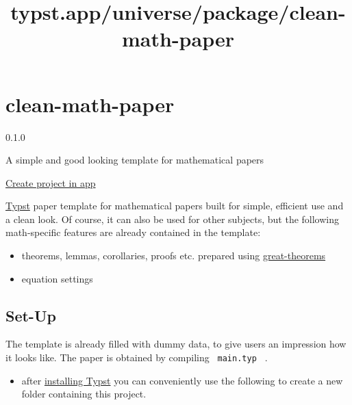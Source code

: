 \title{typst.app/universe/package/clean-math-paper}

\label{banner}
\label{template-thumbnail}

\section{clean-math-paper}\label{clean-math-paper}

{ 0.1.0 }

A simple and good looking template for mathematical papers

\href{/app?template=clean-math-paper&version=0.1.0}{Create project in
app}

\label{readme}
\href{https://github.com/JoshuaLampert/clean-math-paper/actions/workflows/build.yml}{\pandocbounded{}}
\href{https://github.com/JoshuaLampert/clean-math-paper}{}
\href{https://opensource.org/licenses/MIT}{\pandocbounded{}}

\href{https://typst.app/home/}{Typst} paper template for mathematical
papers built for simple, efficient use and a clean look. Of course, it
can also be used for other subjects, but the following math-specific
features are already contained in the template:

\begin{itemize}
\tightlist
\item
  theorems, lemmas, corollaries, proofs etc. prepared using
  \href{https://typst.app/universe/package/great-theorems}{great-theorems}
\item
  equation settings
\end{itemize}

\subsection{Set-Up}\label{set-up}

The template is already filled with dummy data, to give users an
impression how it looks like. The paper is obtained by compiling
\texttt{\ main.typ\ } .

\begin{itemize}
\tightlist
\item
  after
  \href{https://github.com/typst/typst?tab=readme-ov-file\#installation}{installing
  Typst} you can conveniently use the following to create a new folder
  containing this project.
\end{itemize}

